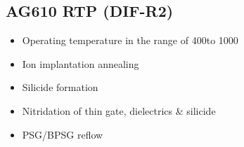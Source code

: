 \subsection{AG610 RTP (DIF-R2)}\label{thermal_RTAAG610_machine}

\begin{minipage}[H]{\MachinePictureMiniPageWidth}
\end{minipage}\begin{minipage}[H]{\MachineTextMiniPageWidth}
	\begin{itemize}
		\item Operating temperature in the range of 400\degreesC to 1000\degreesC
		\item Ion implantation annealing
		\item Silicide formation
		\item Nitridation of thin gate, dielectrics \& silicide
		\item PSG/BPSG reflow
	\end{itemize}

\end{minipage}